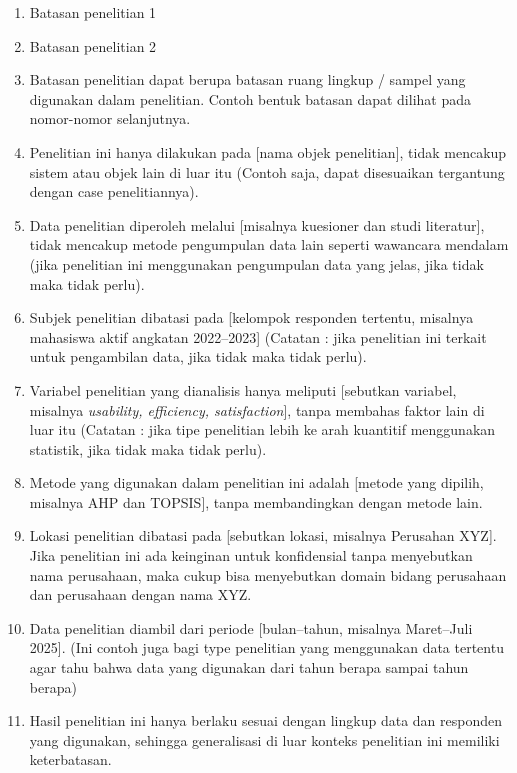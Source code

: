 \begin{enumerate}
\def\labelenumi{\arabic{enumi}.}
\item
  Batasan penelitian 1
\item
  Batasan penelitian 2
\item
  Batasan penelitian dapat berupa batasan ruang lingkup / sampel yang
  digunakan dalam penelitian. Contoh bentuk batasan dapat dilihat pada
  nomor-nomor selanjutnya.
\item
  Penelitian ini hanya dilakukan pada {[}nama objek penelitian{]}, tidak
  mencakup sistem atau objek lain di luar itu (Contoh saja, dapat
  disesuaikan tergantung dengan case penelitiannya).
\item
  Data penelitian diperoleh melalui {[}misalnya kuesioner dan studi
  literatur{]}, tidak mencakup metode pengumpulan data lain seperti
  wawancara mendalam (jika penelitian ini menggunakan pengumpulan data
  yang jelas, jika tidak maka tidak perlu).
\item
  Subjek penelitian dibatasi pada {[}kelompok responden tertentu,
  misalnya mahasiswa aktif angkatan 2022--2023{]} (Catatan : jika
  penelitian ini terkait untuk pengambilan data, jika tidak maka tidak
  perlu).
\item
  Variabel penelitian yang dianalisis hanya meliputi {[}sebutkan
  variabel, misalnya \emph{usability, efficiency, satisfaction}{]},
  tanpa membahas faktor lain di luar itu (Catatan : jika tipe penelitian
  lebih ke arah kuantitif menggunakan statistik, jika tidak maka tidak
  perlu).
\item
  Metode yang digunakan dalam penelitian ini adalah {[}metode yang
  dipilih, misalnya AHP dan TOPSIS{]}, tanpa membandingkan dengan metode
  lain.
\item
  Lokasi penelitian dibatasi pada {[}sebutkan lokasi, misalnya Perusahan
  XYZ{]}. Jika penelitian ini ada keinginan untuk konfidensial tanpa
  menyebutkan nama perusahaan, maka cukup bisa menyebutkan domain bidang
  perusahaan dan perusahaan dengan nama XYZ.
\item
  Data penelitian diambil dari periode {[}bulan--tahun, misalnya
  Maret--Juli 2025{]}. (Ini contoh juga bagi type penelitian yang
  menggunakan data tertentu agar tahu bahwa data yang digunakan dari
  tahun berapa sampai tahun berapa)
\item
  Hasil penelitian ini hanya berlaku sesuai dengan lingkup data dan
  responden yang digunakan, sehingga generalisasi di luar konteks
  penelitian ini memiliki keterbatasan.
\end{enumerate}

